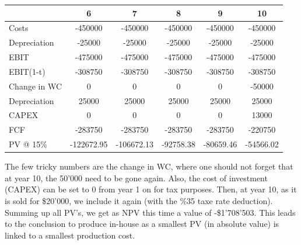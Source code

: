 \documentclass[a4paper,11pt,twoside]{article}
\begin{document}
\begin{center}
\begin{tabular}{|l|c|c|c|c|c|}
	\hline
	& 6 & 7 & 8 & 9 & 10 \\
	\hline
	Costs & -450000 & -450000 & -450000 & -450000 & -450000 \\
	\hline
	Depreciation & -25000 & -25000 & -25000 & -25000 & -25000 \\
	\hline
	EBIT & -475000 & -475000 & -475000 & -475000 & -475000 \\
	\hline
	EBIT(1-t) & -308750 & -308750 & -308750 & -308750 & -308750 \\
	\hline
	Change in WC & 0 & 0 & 0 & 0 & -50000 \\
	\hline
	Depreciation & 25000 & 25000 & 25000 & 25000 & 25000 \\
	\hline
	CAPEX & 0 & 0 & 0 & 0 & 13000 \\
	\hline
	FCF & -283750 & -283750 & -283750 & -283750 & -220750 \\
	\hline
	PV @ 15\% & -122672.95 & -106672.13 & -92758.38 & -80659.46 & -54566.02 \\
	\hline
\end{tabular}
\end{center}

The few tricky numbers are the change in WC, where one should not forget that at year 10, the 50'000 need to be gone again. Also, the cost of investment (CAPEX) can be set to 0 from year 1 on for tax purposes. Then, at year 10, as it is sold for \$20'000, we include it again (with the \%35 taxe rate deduction). Summing up all PV's, we get as NPV this time a value of -\$1'708'503. This leads to the conclusion to produce in-house as a smallest PV (in absolute value) is linked to a smallest production cost.






\end{document}
